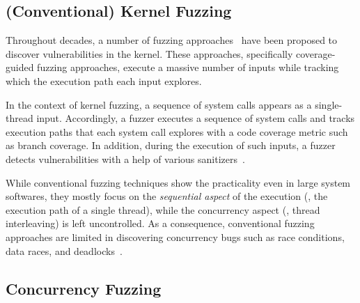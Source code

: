 
\subsection{(Conventional) Kernel Fuzzing}
\label{ss:kernelfuzzing}

Throughout decades, a number of fuzzing approaches~\cite{imf,
  syzkaller, moonshine, hfl, healer, janus, hydra, trinity} have been
proposed to discover vulnerabilities in the kernel.
%
These approaches, specifically coverage-guided fuzzing approaches,
execute a massive number of inputs while tracking which the execution
path each input explores.

In the context of kernel fuzzing, a sequence of system calls appears
as a single-thread input. Accordingly, a fuzzer executes a sequence of
system calls and tracks execution paths that each system call explores
with a code coverage metric such as branch coverage.
%
In addition, during the execution of such inputs, a fuzzer detects
vulnerabilities with a help of various sanitizers~\cite{meds, kasan,
  asan, ubsan, lockdep}.


While conventional fuzzing techniques show the practicality even in
large system softwares, they mostly focus on the \textit{sequential
  aspect} of the execution (\ie, the execution path of a single
thread), while the concurrency aspect (\ie, thread interleaving) is
left uncontrolled.
%
%
As a consequence, conventional fuzzing approaches are limited in
discovering concurrency bugs such as race conditions, data races, and
deadlocks~\cite{covcon, terragni2018effectiveness}.





\subsection{Concurrency Fuzzing}
\label{ss:concurrencyfuzzing}



